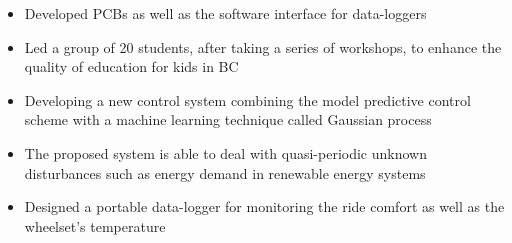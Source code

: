 \documentclass[10pt,letterpaper,ragged2e,compact]{mocv}
\begin{document}
\begin{paracol}{2}
\begin{itemize}
    \end{itemize}
    \divider
    \begin{itemize}
        \item Developed PCBs as well as the software interface for data-loggers
    \end{itemize}
    \divider
    \divider
    \begin{itemize}
        \item Led a group of 20 students, after taking a series of workshops, to enhance the quality of education for kids in BC
    \end{itemize}
    \begin{itemize}
        \item Developing a new control system combining the model predictive control scheme with a machine learning technique called Gaussian process
        \item The proposed system is able to deal with quasi-periodic unknown disturbances such as energy demand in renewable energy systems
    \end{itemize}
    \divider
    \begin{itemize}
        \item Designed a portable data-logger for monitoring the ride comfort as well as the wheelset’s temperature
    \end{itemize}
    \divider
    \begin{itemize}

\end{itemize}
\end{paracol}
\end{document}
